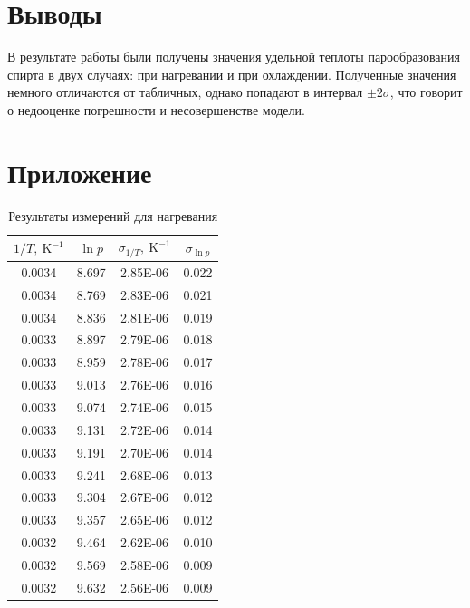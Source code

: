 \documentclass[a4paper,12pt]{report}
\begin{document}
\newpage
\section{Выводы}
\begin{multicols}{2}
    В результате работы были получены значения удельной теплоты парообразования спирта в двух случаях: при нагревании и при охлаждении. Полученные значения немного отличаются от табличных, однако попадают в интервал $\pm 2\sigma$, что говорит о недооценке погрешности и несовершенстве модели.
\end{multicols}

\section{Приложение}
\begin{multicols}{2}
    \begin{table}[H]
        \centering
        \begin{tabular}{|c|c|c|c|}
            \hline
            $1/T, \ \text{K}^{-1}$ & $\ln p$ & $\sigma_{1/T}, \ \text{K}^{-1}$ & $\sigma_{\ln p}$ \\
            \hline
            0.0034 & 8.697 & 2.85E-06 & 0.022 \\
            \hline
            0.0034 & 8.769 & 2.83E-06 & 0.021 \\
            \hline
            0.0034 & 8.836 & 2.81E-06 & 0.019 \\
            \hline
            0.0033 & 8.897 & 2.79E-06 & 0.018 \\
            \hline
            0.0033 & 8.959 & 2.78E-06 & 0.017 \\
            \hline
            0.0033 & 9.013 & 2.76E-06 & 0.016 \\
            \hline
            0.0033 & 9.074 & 2.74E-06 & 0.015 \\
            \hline
            0.0033 & 9.131 & 2.72E-06 & 0.014 \\
            \hline
            0.0033 & 9.191 & 2.70E-06 & 0.014 \\
            \hline
            0.0033 & 9.241 & 2.68E-06 & 0.013 \\
            \hline
            0.0033 & 9.304 & 2.67E-06 & 0.012 \\
            \hline
            0.0033 & 9.357 & 2.65E-06 & 0.012 \\
            \hline
            0.0032 & 9.464 & 2.62E-06 & 0.010 \\
            \hline
            0.0032 & 9.569 & 2.58E-06 & 0.009 \\
            \hline
            0.0032 & 9.632 & 2.56E-06 & 0.009 \\
            \hline
        \end{tabular}
        \caption{Результаты измерений для нагревания}
    \end{table}
    \newcolumn


\end{multicols}
\end{document}

